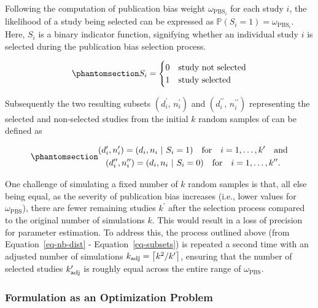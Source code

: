 \documentclass[
  12pt,
]{scrartcl}
\newcommand{\pbs}{\omega_{\text{PBS}}}
\begin{document}
Following the computation of publication bias weight
\(\omega_{\text{PBS}_i}\) for each study \(i\), the likelihood of a
study being selected can be expressed as
\(\mathbb{P}(S_i = 1)= \omega_{\text{PBS}_i}\). Here, \(S_i\) is a
binary indicator function, signifying whether an individual study \(i\)
is selected during the publication bias selection process.

\begin{equation}\phantomsection\label{eq-id-fun}{
S_i = 
\begin{cases}  
  0 & \text{study not selected} \\
  1 & \text{study selected}
\end{cases}
}\end{equation}

\noindent Subsequently the two resulting subsets
\((d_i^\prime, \,n_i^\prime)\) and
\((d_i^{\prime\prime}, \,n_i^{\prime\prime})\) representing the selected
and non-selected studies from the initial \(k\) random samples of can be
defined as

\begin{equation}\phantomsection\label{eq-subsets}{
\begin{gathered}
(d_i^\prime, n_i^\prime) = (d_i, n_i ~ | ~ S_i = 1) \quad \text{for} \quad i = 1, \dots, k^\prime \quad \text{and} \\
(d_i^{\prime\prime}, n_i^{\prime\prime}) = (d_i, n_i ~ | ~ S_i = 0) \quad \text{for} \quad i = 1, \dots, k^{\prime\prime}.
\end{gathered}
}\end{equation}

One challenge of simulating a fixed number of \(k\) random samples is
that, all else being equal, as the severity of publication bias
increases (i.e., lower values for \(\pbs\)), there are fewer remaining
studies \(k^\prime\) after the selection process compared to the
original number of simulations \(k\). This would result in a loss of
precision for parameter estimation. To address this, the process
outlined above (from Equation~\ref{eq-nb-dist} -
Equation~\ref{eq-subsets}) is repeated a second time with an adjusted
number of simulations
\(k_{\small{\text{adj}}} = \big\lceil {k^2}/{k'} \big\rceil\), ensuring
that the number of selected studies \(k^\prime_{\small{\text{adj}}}\) is
roughly equal across the entire range of \(\pbs\).

\subsubsection{Formulation as an Optimization
Problem}\label{formulation-as-an-optimization-problem}
\end{document}
